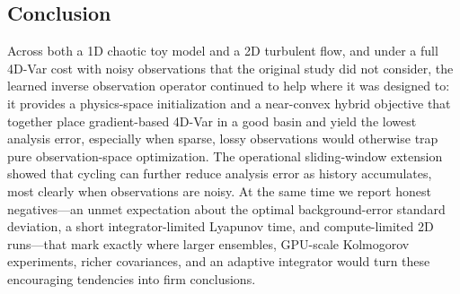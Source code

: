 \subsection{Conclusion}

Across both a 1D chaotic toy model and a 2D turbulent flow, and under a full
4D-Var cost with noisy observations that the original study did not consider,
the learned inverse observation operator continued to help where it was
designed to: it provides a physics-space initialization and a near-convex
hybrid objective that together place gradient-based 4D-Var in a good basin and
yield the lowest analysis error, especially when sparse, lossy observations
would otherwise trap pure observation-space optimization. The operational
sliding-window extension showed that cycling can further reduce analysis error
as history accumulates, most clearly when observations are noisy. At the same
time we report honest negatives---an unmet expectation about the optimal
background-error standard deviation, a short integrator-limited Lyapunov time, and
compute-limited 2D runs---that mark exactly where larger ensembles, GPU-scale
Kolmogorov experiments, richer covariances, and an adaptive integrator would
turn these encouraging tendencies into firm conclusions.
